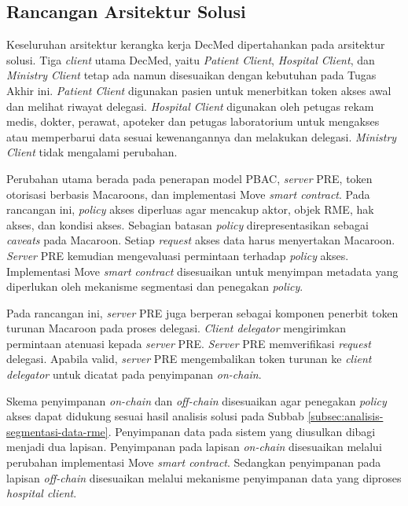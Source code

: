 \subsection{Rancangan Arsitektur Solusi}
\label{subsec:rancangan-arsitektur-solusi}

Keseluruhan arsitektur kerangka kerja DecMed dipertahankan pada arsitektur solusi. Tiga \textit{client} utama DecMed, yaitu \textit{Patient Client}, \textit{Hospital Client}, dan \textit{Ministry Client} tetap ada namun disesuaikan dengan kebutuhan pada Tugas Akhir ini. \textit{Patient Client} digunakan pasien untuk menerbitkan token akses awal dan melihat riwayat delegasi. \textit{Hospital Client} digunakan oleh petugas rekam medis, dokter, perawat, apoteker dan petugas laboratorium untuk mengakses atau memperbarui data sesuai kewenangannya dan melakukan delegasi. \textit{Ministry Client} tidak mengalami perubahan.

Perubahan utama berada pada penerapan model PBAC, \textit{server} PRE, token otorisasi berbasis Macaroons, dan implementasi Move \textit{smart contract}. Pada rancangan ini, \textit{policy} akses diperluas agar mencakup aktor, objek RME, hak akses, dan kondisi akses. Sebagian batasan \textit{policy} direpresentasikan sebagai \textit{caveats} pada Macaroon. Setiap \textit{request} akses data harus menyertakan Macaroon. \textit{Server} PRE kemudian mengevaluasi permintaan terhadap \textit{policy} akses. Implementasi Move \textit{smart contract} disesuaikan untuk menyimpan metadata yang diperlukan oleh mekanisme segmentasi dan penegakan \textit{policy}.

Pada rancangan ini, \textit{server} PRE juga berperan sebagai komponen penerbit token turunan Macaroon pada proses delegasi. \textit{Client delegator} mengirimkan permintaan atenuasi kepada \textit{server} PRE. \textit{Server} PRE memverifikasi \textit{request} delegasi. Apabila valid, \textit{server} PRE mengembalikan token turunan ke \textit{client delegator} untuk dicatat pada penyimpanan \textit{on-chain}.

Skema penyimpanan \textit{on-chain} dan \textit{off-chain} disesuaikan agar penegakan \textit{policy} akses dapat didukung sesuai hasil analisis solusi pada Subbab \ref{subsec:analisis-segmentasi-data-rme}. Penyimpanan data pada sistem yang diusulkan dibagi menjadi dua lapisan. Penyimpanan pada lapisan \textit{on-chain} disesuaikan melalui perubahan implementasi Move \textit{smart contract}. Sedangkan penyimpanan pada lapisan \textit{off-chain} disesuaikan melalui mekanisme penyimpanan data yang diproses \textit{hospital client}.

